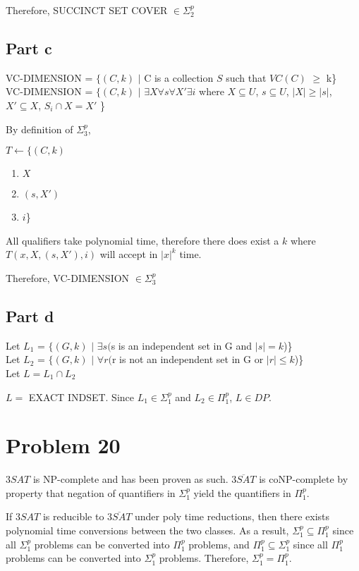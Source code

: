 \documentclass{article}
\begin{document}
Therefore, SUCCINCT SET COVER $\in \Sigma_{2}^{p}$

\subsection{Part c}
VC-DIMENSION = $\{(C,k)$ $|$ C is a collection $S$ such that $VC(C)$ $\geq$ k\}\\
VC-DIMENSION = $\{(C,k)$ $|$ $\exists X \forall s \forall X' \exists i$ where $X \subseteq U$, $s \subseteq U$, $|X| \geq |s|$, $X' \subseteq X$, $S_{i} \cap X = X'$ \}

\bigskip
By definition of $\Sigma_{3}^{p}$, 

$T \leftarrow \{(C,k)$ \begin{enumerate}[label=]
\item $X$
\item $(s,X')$
\item $i$\}
\end{enumerate}

All qualifiers take polynomial time, therefore there does exist a $k$ where $T(x,X,(s,X'),i)$ will accept in $|x|^{k}$ time.

Therefore, VC-DIMENSION $\in \Sigma_{3}^{p}$

\subsection{Part d}
Let $L_{1}$ = $\{(G,k)$ $|$ $\exists s ($s is an independent set in G and $|s|=k$)\}
\\
Let $L_{2}$ = $\{(G,k)$ $|$ $\forall r ($r is not an independent set in G or $|r|\leq k$)\}
\\
Let $L = L_{1} \cap L_{2}$

\bigskip
$L = $ EXACT INDSET.  Since $L_{1} \in \Sigma_{1}^{p}$ and $L_{2} \in \Pi_{1}^{p}$, $L \in DP$.


\section{Problem 20}

$3SAT$ is NP-complete and has been proven as such.  $\overline{3SAT}$ is coNP-complete by property that negation of quantifiers in $\Sigma_{1}^{p}$ yield the quantifiers in $\Pi_{1}^{p}$.

If $3SAT$ is reducible to $\overline{3SAT}$ under poly time reductions, then there exists polynomial time conversions between the two classes.  As a result, $\Sigma_{1}^{p} \subseteq \Pi_{1}^{p}$ since all $\Sigma_{1}^{p}$ problems can be converted into $\Pi_{1}^{p}$ problems, and $\Pi_{1}^{p} \subseteq \Sigma_{1}^{p}$ since all $\Pi_{1}^{p}$ problems can be converted into $\Sigma_{1}^{p}$ problems.  Therefore, $\Sigma_{1}^{p} = \Pi_{1}^{p}$.
\end{document}
